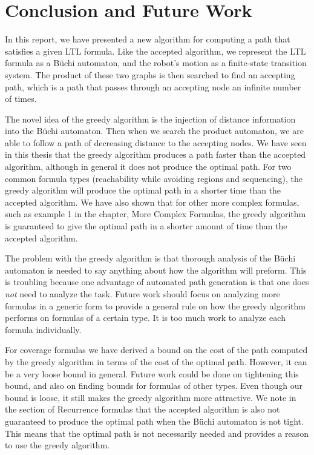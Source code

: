 \chapter{Conclusion and Future Work}
In this report, we have presented a new algorithm for computing a path that satisfies a given LTL formula. Like the accepted algorithm, we represent the LTL formula as a B\"uchi automaton, and the robot's motion as a finite-state transition system. The product of these two graphs is then searched to find an accepting path, which is a path that passes through an accepting node an infinite number of times. 

The novel idea of the greedy algorithm is the injection of distance information into the B\"uchi automaton. Then when we search the product automaton, we are able to follow a path of decreasing distance to the accepting nodes. We have seen in this thesis that the greedy algorithm produces a path faster than the accepted algorithm, although in general it does not produce the optimal path. For two common formula types (reachability while avoiding regions and sequencing), the greedy algorithm will produce the optimal path in a shorter time than the accepted algorithm. We have also shown that for other more complex formulas, such as example 1 in the chapter, More Complex Formulas, the greedy algorithm is guaranteed to give the optimal path in a shorter amount of time than the accepted algorithm. 

The problem with the greedy algorithm is that thorough analysis of the B\"uchi automaton is needed to say anything about how the algorithm will preform. This is troubling because one advantage of automated path generation is that one does \textit{not} need to analyze the task. Future work should focus on analyzing more formulas in a generic form to provide a general rule on how the greedy algorithm performs on formulas of a certain type. It is too much work to analyze each formula individually.    

For coverage formulas we have derived a bound on the cost of the path computed by the greedy algorithm in terms of the cost of the optimal path. However, it can be a very loose bound in general. Future work could be done on tightening this bound, and also on finding bounds for formulas of other types. Even though our bound is loose, it still makes the greedy algorithm more attractive. We note in the section of Recurrence formulas that the accepted algorithm is also not guaranteed to produce the optimal path when the B\"uchi automaton is not tight. This means that the optimal path is not necessarily needed and provides a reason to use the greedy algorithm.

